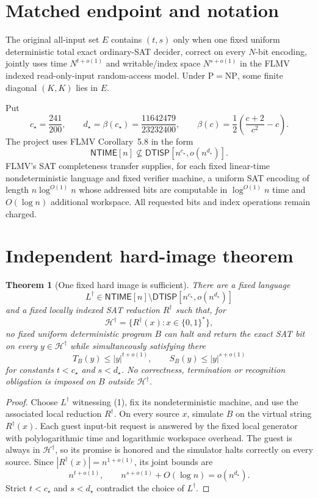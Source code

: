 \documentclass[11pt]{article}
\newtheorem{theorem}{Theorem}
\newcommand{\NTIME}{\mathsf{NTIME}}
\newcommand{\DTISP}{\mathsf{DTISP}}
\begin{document}
\section{Matched endpoint and notation}
The original all-input set $E$ contains $(t,s)$ only when one fixed uniform
deterministic total exact ordinary-SAT decider, correct on every $N$-bit
encoding, jointly uses time $N^{t+o(1)}$ and writable/index space
$N^{s+o(1)}$ in the FLMV indexed read-only-input random-access model.  Under
$\mathrm P=\mathrm{NP}$, some finite diagonal $(K,K)$ lies in $E$.

Put
\[
 c_\star=\frac{241}{200},\qquad
 d_\star=\beta(c_\star)=\frac{11642479}{23232400},
 \qquad \beta(c)=\frac12\left(\frac{c+2}{c^2}-c\right).
\]
The project uses FLMV Corollary~5.8 in the form
\[
 \NTIME[n]\not\subseteq\DTISP[n^{c_\star},o(n^{d_\star})].
\tag{1}
\]
FLMV's SAT completeness transfer supplies, for each fixed linear-time
nondeterministic language and fixed verifier machine, a uniform SAT encoding
of length $n\log^{O(1)}n$ whose addressed bits are computable in
$\log^{O(1)}n$ time and $O(\log n)$ additional workspace.  All requested
bits and index operations remain charged.

\section{Independent hard-image theorem}
\begin{theorem}[One fixed hard image is sufficient]
There are a fixed language
\[
 L^\dagger\in\NTIME[n]\setminus
 \DTISP[n^{c_\star},o(n^{d_\star})]
\]
and a fixed locally indexed SAT reduction $R^\dagger$ such that, for
\[
 \mathcal H^\dagger=\{R^\dagger(x):x\in\{0,1\}^*\},
\]
no fixed uniform deterministic program $B$ can halt and return the exact SAT
bit on every $y\in\mathcal H^\dagger$ while simultaneously satisfying there
\[
 T_B(y)\le |y|^{t+o(1)},\qquad
 S_B(y)\le |y|^{s+o(1)}
\]
for constants $t<c_\star$ and $s<d_\star$.  No correctness, termination or
recognition obligation is imposed on $B$ outside $\mathcal H^\dagger$.
\end{theorem}
\begin{proof}
Choose $L^\dagger$ witnessing (1), fix its nondeterministic machine, and use
the associated local reduction $R^\dagger$.  On every source $x$, simulate
$B$ on the virtual string $R^\dagger(x)$.  Each guest input-bit request is
answered by the fixed local generator with polylogarithmic time and logarithmic
workspace overhead.  The guest is always in $\mathcal H^\dagger$, so its
promise is honored and the simulator halts correctly on every source.  Since
$|R^\dagger(x)|=n^{1+o(1)}$, its joint bounds are
\[
 n^{t+o(1)},\qquad n^{s+o(1)}+O(\log n)=o(n^{d_\star}).
\]
Strict $t<c_\star$ and $s<d_\star$ contradict the choice of $L^\dagger$.
\end{proof}
\end{document}
